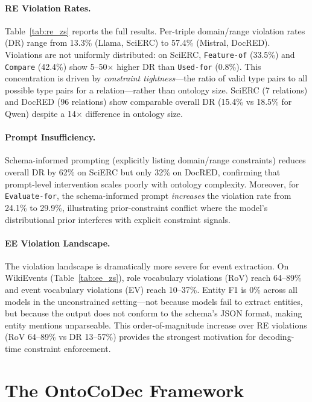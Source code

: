 \documentclass[11pt]{article}
\newcommand{\sys}{OntoCoDec}
\begin{document}
\paragraph{RE Violation Rates.}
Table~\ref{tab:re_zs} reports the full results.
Per-triple domain/range violation rates (DR) range from 13.3\% (Llama, SciERC) to 57.4\% (Mistral, DocRED).
Violations are not uniformly distributed: on SciERC, \texttt{Feature-of} (33.5\%) and \texttt{Compare} (42.4\%) show 5--50$\times$ higher DR than \texttt{Used-for} (0.8\%).
This concentration is driven by \emph{constraint tightness}---the ratio of valid type pairs to all possible type pairs for a relation---rather than ontology size.
SciERC (7 relations) and DocRED (96 relations) show comparable overall DR (15.4\% vs 18.5\% for Qwen) despite a 14$\times$ difference in ontology size.

\paragraph{Prompt Insufficiency.}
Schema-informed prompting (explicitly listing domain/range constraints) reduces overall DR by 62\% on SciERC but only 32\% on DocRED, confirming that prompt-level intervention scales poorly with ontology complexity.
Moreover, for \texttt{Evaluate-for}, the schema-informed prompt \emph{increases} the violation rate from 24.1\% to 29.9\%, illustrating prior-constraint conflict where the model's distributional prior interferes with explicit constraint signals.

\paragraph{EE Violation Landscape.}
The violation landscape is dramatically more severe for event extraction.
On WikiEvents (Table~\ref{tab:ee_zs}), role vocabulary violations (RoV) reach 64--89\% and event vocabulary violations (EV) reach 10--37\%.
Entity F1 is 0\% across all models in the unconstrained setting---not because models fail to extract entities, but because the output does not conform to the schema's JSON format, making entity mentions unparseable.
This order-of-magnitude increase over RE violations (RoV 64--89\% vs DR 13--57\%) provides the strongest motivation for decoding-time constraint enforcement.

\section{The \sys{} Framework}
\label{sec:method}
\end{document}
